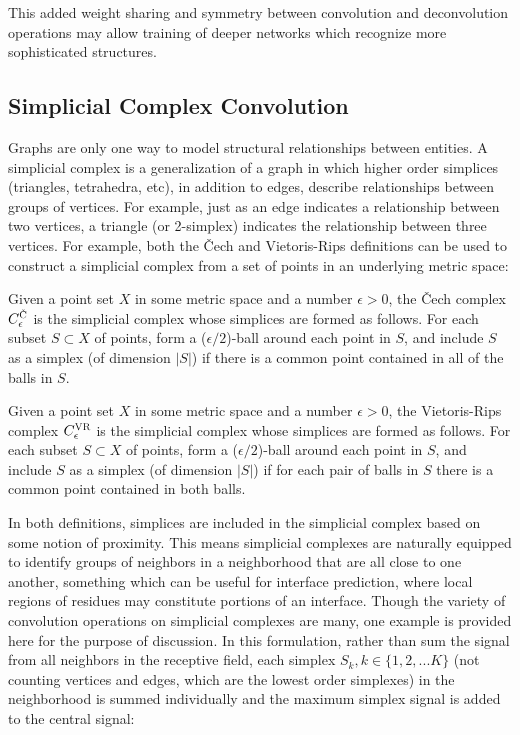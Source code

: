 \noindent
This added weight sharing and symmetry between convolution and deconvolution operations may allow training of deeper networks which recognize more sophisticated structures.



\subsection{Simplicial Complex Convolution}

Graphs are only one way to model structural relationships between entities.
A simplicial complex is a generalization of a graph in which higher order simplices (triangles, tetrahedra, etc), in addition to edges, describe relationships between groups of vertices. 
For example, just as an edge indicates a relationship between two vertices, a triangle (or 2-simplex) indicates the relationship between three vertices.
For example, both the \v{C}ech and Vietoris-Rips definitions can be used to construct a simplicial complex from a set of points in an underlying metric space:

\begin{definition}
	Given a point set $X$ in some metric space and a number $\epsilon>0$, the \v{C}ech complex $C^{\textsc{\v{C}}}_\epsilon$ is the simplicial complex whose simplices are formed as follows. For each subset $S \subset X$ of points, form a ($\epsilon/2$)-ball around each point in $S$, and include $S$ as a simplex (of dimension $|S|$) if there is a common point contained in all of the balls in $S$.
\end{definition}

\begin{definition}
	Given a point set $X$ in some metric space and a number $\epsilon>0$, the Vietoris-Rips complex $C^{\textsc{VR}}_\epsilon$ is the simplicial complex whose simplices are formed as follows. For each subset $S \subset X$ of points, form a ($\epsilon/2$)-ball around each point in $S$, and include $S$ as a simplex (of dimension $|S|$) if for each pair of balls in $S$ there is a common point contained in both balls.
\end{definition}

In both definitions, simplices are included in the simplicial complex based on some notion of proximity.
This means simplicial complexes are naturally equipped to identify groups of neighbors in a neighborhood that are all close to one another, something which can be useful for interface prediction, where local regions of residues may constitute portions of an interface.
Though the variety of convolution operations on simplicial complexes are many, one example is provided here for the purpose of discussion. 
In this formulation, rather than sum the signal from all neighbors in the receptive field, each simplex $S_k, k \in \{1, 2,... K\}$ (not counting vertices and edges, which are the lowest order simplexes) in the neighborhood is summed individually and the maximum simplex signal is added to the central signal:

